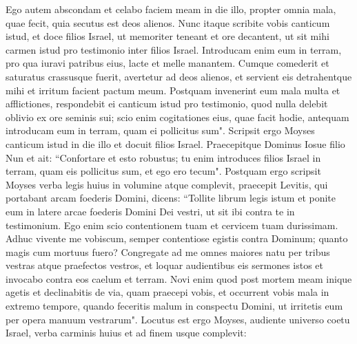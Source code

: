\begin{biblechapter}
\verse Ego autem abscondam et celabo faciem meam in die illo, propter omnia mala, quae fecit, quia secutus est deos alienos. 
\verse Nunc itaque scribite vobis canticum istud, et doce filios Israel, ut memoriter teneant et ore decantent, ut sit mihi carmen istud pro testimonio inter filios Israel. 
\verse Introducam enim eum in terram, pro qua iuravi patribus eius, lacte et melle manantem. Cumque comederit et saturatus crassusque fuerit, avertetur ad deos alienos, et servient eis detrahentque mihi et irritum facient pactum meum. 
\verse Postquam invenerint eum mala multa et afflictiones, respondebit ei canticum istud pro testimonio, quod nulla delebit oblivio ex ore seminis sui; scio enim cogitationes eius, quae facit hodie, antequam introducam eum in terram, quam ei pollicitus sum". 
\verse Scripsit ergo Moyses canticum istud in die illo et docuit filios Israel. 
\verse Praecepitque Dominus Iosue filio Nun et ait: “Confortare et esto robustus; tu enim introduces filios Israel in terram, quam eis pollicitus sum, et ego ero tecum". 
\verse Postquam ergo scripsit Moyses verba legis huius in volumine atque complevit, 
\verse praecepit Levitis, qui portabant arcam foederis Domini, dicens: 
\verse “Tollite librum legis istum et ponite eum in latere arcae foederis Domini Dei vestri, ut sit ibi contra te in testimonium. 
\verse Ego enim scio contentionem tuam et cervicem tuam durissimam. Adhuc vivente me vobiscum, semper contentiose egistis contra Dominum; quanto magis cum mortuus fuero? 
\verse Congregate ad me omnes maiores natu per tribus vestras atque praefectos vestros, et loquar audientibus eis sermones istos et invocabo contra eos caelum et terram. 
\verse Novi enim quod post mortem meam inique agetis et declinabitis de via, quam praecepi vobis, et occurrent vobis mala in extremo tempore, quando feceritis malum in conspectu Domini, ut irritetis eum per opera manuum vestrarum". 
\verse Locutus est ergo Moyses, audiente universo coetu Israel, verba carminis huius et ad finem usque complevit: 
\end{biblechapter}

